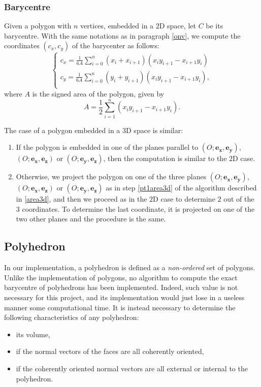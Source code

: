 \subsubsection{Barycentre}
Given a polygon with $n$ vertices, embedded in a $2$D space, let $C$ be its barycentre. With the same notations as in paragraph \ref{onv}, we compute the coordinates $(c_x,c_y)$ of the barycenter as follows:
$$
\begin{cases}
c_x=\frac{1}{6A}\sum_{i=0}^{n} (x_i+x_{i+1})(x_iy_{i+1}-x_{i+1}y_i) \\
c_y=\frac{1}{6A}\sum_{i=0}^{n} (y_i+y_{i+1})(x_iy_{i+1}-x_{i+1}y_i), \\
\end{cases}
$$
where $A$ is the signed area of the polygon, given by
$$A=\frac{1}{2} \sum_{i=1}^n (x_iy_{i+1}-x_{i+1}y_i). $$

\noindent The case of a polygon embedded in a $3$D space is similar:
\begin{enumerate}
\item If the polygon is embedded in one of the planes parallel to $(O;\mathbf{e_x},\mathbf{e_y})$, $(O;\mathbf{e_x},\mathbf{e_z})$ or $(O;\mathbf{e_y},\mathbf{e_z})$, then the computation is similar to the $2$D case. 
\item Otherwise, we project the polygon on one of the three planes $(O;\mathbf{e_x},\mathbf{e_y})$, $(O;\mathbf{e_x},\mathbf{e_z})$ or $(O;\mathbf{e_y},\mathbf{e_z})$ as in step \ref{pt1area3d} of the algorithm described in \ref{area3d}, and then we proceed as in the $2$D case to determine $2$ out of the $3$ coordinates. To determine the last coordinate, it is projected on one of the two other planes and the procedure is the same. 
\end{enumerate}

\subsection{Polyhedron}
In our implementation, a polyhedron is defined as a \textit{non-ordered} set of polygons. Unlike the implementation of polygons, no algorithm to compute the exact barycentre of polyhedrons has been implemented. Indeed, such value is not necessary for this project, and its implementation would just lose in a useless manner some computational time. It is instead necessary to determine the following characteristics of any polyhedron:
\begin{itemize}
\item its volume, 
\item if the normal vectors of the faces are all coherently oriented, 
\item if the coherently oriented normal vectors are all external or internal to the polyhedron. 
\end{itemize}

